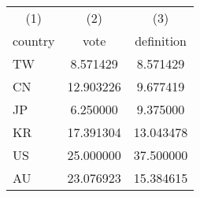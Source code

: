 {
\def\sym#1{\ifmmode^{#1}\else\(^{#1}\)\fi}
\begin{tabular}{l c c}
\hline\hline

\multicolumn{1}{c}{(1)}
&\multicolumn{1}{c}{(2)}
&\multicolumn{1}{c}{(3)}
\\

\multicolumn{1}{c}{country}
&\multicolumn{1}{c}{vote}
&\multicolumn{1}{c}{definition}
\\
\hline
TW & 8.571429 & 8.571429 \\
CN & 12.903226 & 9.677419 \\
JP & 6.250000 & 9.375000 \\
KR & 17.391304 & 13.043478 \\
US & 25.000000 & 37.500000 \\
AU & 23.076923 & 15.384615 \\
\hline\hline
\end{tabular}
}
